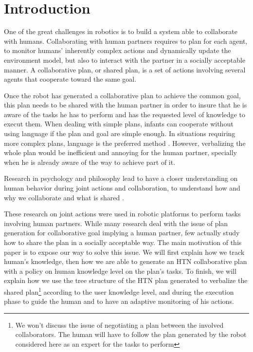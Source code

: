 \documentclass{llncs}
\begin{document}
\section{Introduction}
One of the great challenges in robotics is to build a system able to collaborate with humans. Collaborating with human partners requires to plan for each agent, to monitor humans' inherently complex actions and dynamically update the environment model, but also to interact with the partner in a socially acceptable manner.
A collaborative plan, or shared plan, is a set of actions involving several agents that cooperate toward the same goal.
%

Once the robot has generated a collaborative plan to achieve the common goal, this plan needs to be shared with the human partner in order to insure that he is aware of the tasks he has to perform and has the requested level of knowledge to execut them. When dealing with simple plans, infants can cooperate without using language if the plan and goal are simple enough. In situations requiring more complex plans, language is the preferred method \cite{Warneken2006,Warneken2007}. However, verbalizing the whole plan would be inefficient and 
annoying for the human partner, specially when he is already aware of the way to achieve part of it.  

Research in psychology and philosophy lead to have a closer understanding on human behavior during joint actions and collaboration, to understand how \cite{tomasello2005} and why \cite{tomasello2009} we collaborate and what is shared \cite{Butterfill2011}.

These research on joint actions were used in robotic platforms to perform tasks involving human partners. While many research deal with the issue of plan generation for collaborative goal implying a human partner,
 few actually study how to share the plan in a socially acceptable way.
The main motivation of this paper is to expose our way to solve this issue. We will first explain how we track human's knowledge, then how we are able to generate an HTN collaborative plan with a policy on human knowledge level on the plan's tasks. To finish, we will explain how we use the tree structure of the HTN  plan generated to verbalize the shared plan\footnote{We won't discuss the issue of negotiating a plan between the involved collaborators. The human will have to follow the plan generated by the robot considered here as an expert for the tasks to perform} according to the user knowledge level, and during the execution phase to guide the human and to have an adaptive monitoring of his actions. 
\end{document}

